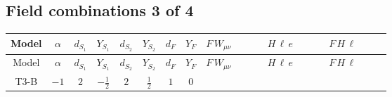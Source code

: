 \documentclass[8pt]{article}
\begin{document}
\begin{landscape}
\subsection*{Field combinations 3 of 4}
\begin{longtable}{@{}cccccccc >{\raggedright\arraybackslash}p{0.21\linewidth} >{\raggedright\arraybackslash}p{0.21\linewidth} >{\raggedright\arraybackslash}p{0.21\linewidth}@{}}
\toprule
Model & $\alpha$ & $d_{S_1}$ & $Y_{S_1}$ & $d_{S_2}$ & $Y_{S_2}$ & $d_F$ & $Y_F$ & $F\,W_{\mu\nu}$ & $H\,\ell\,e$ & $F\,H\,\ell$ \\
\midrule
\endfirsthead
\toprule
Model & $\alpha$ & $d_{S_1}$ & $Y_{S_1}$ & $d_{S_2}$ & $Y_{S_2}$ & $d_F$ & $Y_F$ & $F\,W_{\mu\nu}$ & $H\,\ell\,e$ & $F\,H\,\ell$ \\
\midrule
\endhead
T3-B & $-1$ & $2$ & $-\frac{1}{2}$ & $2$ & $\frac{1}{2}$ & $1$ & $0$ &  & \scriptsize\adjustbox{max width=\linewidth}{$\begin{gathered} +\frac{\hbar  \overline{y_{1,i_3,r_1}} \overline{L_{a_1,i_2}}\, P_R\, e_{i_1} H_{a_1} y_{1,i_2,r_1} Y_{e,i_3,i_1}}{4 \epsilon } \\ -\frac{1}{8} \hbar  \overline{y_{1,i_3,r_1}} \overline{L_{a_1,i_2}}\, P_R\, e_{i_1} H_{a_1} y_{1,i_2,r_1} Y_{e,i_3,i_1} \\ +\frac{\hbar  \overline{y_{2,i_3,r_1}} \overline{L_{a_1,i_2}}\, P_R\, e_{i_1} H_{a_1} y_{2,i_2,r_1} Y_{e,i_3,i_1}}{4 \epsilon }\end{gathered}$} & \scriptsize\adjustbox{max width=\linewidth}{$\begin{gathered} +\frac{2 \hbar  \log \left(\frac{M_F^2}{m_2^2}\right) \overline{y_{1,i_1,r_1}} \overline{y_{2,i_2,r_1}} L_{a_4,i_2}{}^T\, C\, P_L\, L_{a_2,i_1} H_{a_1} H_{a_3} m_2^2 \lambda_5 \epsilon_{a_1,a_2} \epsilon_{a_3,a_4} M_F^3}{\sqrt{3} \left(M_F^2-m_1^2\right) \left(M_F^2-m_2^2\right) \left(m_1^2-m_2^2\right)} \\ -\frac{2 \hbar  \log \left(\frac{M_F^2}{m_1^2}\right) \overline{y_{1,i_1,r_1}} \overline{y_{2,i_2,r_1}} L_{a_4,i_2}{}^T\, C\, P_L\, L_{a_2,i_1} H_{a_1} H_{a_3} m_1^2 \lambda_5 \epsilon_{a_1,a_2} \epsilon_{a_3,a_4} M_F^3}{\sqrt{3} \left(M_F^2-m_1^2\right) \left(M_F^2-m_2^2\right) \left(m_1^2-m_2^2\right)} \\ +\frac{2 \hbar  \log \left(\frac{M_F^2}{m_2^2}\right) \overline{\lambda_5} \overline{L_{a_3,i_1}}\, C\, P_R\, \overline{L_{a_4,i_2}}{}^T m_2^2 y_{1,i_1,r_1} y_{2,i_2,r_1} \epsilon_{a_1,a_3} \epsilon_{a_2,a_4} H_{a_1}{}^{\dagger } H_{a_2}{}^{\dagger } M_F^3}{\sqrt{3} \left(M_F^2-m_1^2\right) \left(M_F^2-m_2^2\right) \left(m_1^2-m_2^2\right)}\end{gathered}$} \\

\end{longtable}
\end{landscape}
\end{document}
